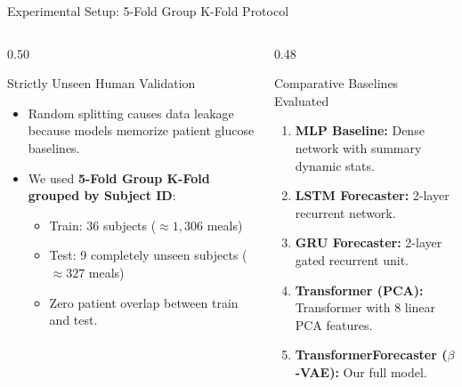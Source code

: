 \documentclass[aspectratio=169, 10pt]{beamer}
\begin{document}
\begin{frame}{Experimental Setup: 5-Fold Group K-Fold Protocol}
  \begin{columns}[c]
    \begin{column}{0.50\textwidth}
      \begin{block}{Strictly Unseen Human Validation}
        \begin{itemize}\setlength{\itemsep}{0.5em}
          \item Random splitting causes data leakage because models memorize patient glucose baselines.
          \item We used \textbf{5-Fold Group K-Fold grouped by Subject ID}:
          \begin{itemize}\setlength{\itemsep}{0.2em}
            \item Train: 36 subjects ($\approx 1,306$ meals)
            \item Test: 9 completely unseen subjects ($\approx 327$ meals)
            \item Zero patient overlap between train and test.
          \end{itemize}
        \end{itemize}
      \end{block}
    \end{column}
    
    \begin{column}{0.48\textwidth}
      \begin{block}{Comparative Baselines Evaluated}
        \begin{enumerate}\setlength{\itemsep}{0.4em}
          \item \textbf{MLP Baseline:} Dense network with summary dynamic stats.
          \item \textbf{LSTM Forecaster:} 2-layer recurrent network.
          \item \textbf{GRU Forecaster:} 2-layer gated recurrent unit.
          \item \textbf{Transformer (PCA):} Transformer with 8 linear PCA features.
          \item \textbf{TransformerForecaster ($\beta$-VAE):} Our full model.
        \end{enumerate}
      \end{block}
    \end{column}
  \end{columns}
\end{frame}
\end{document}

